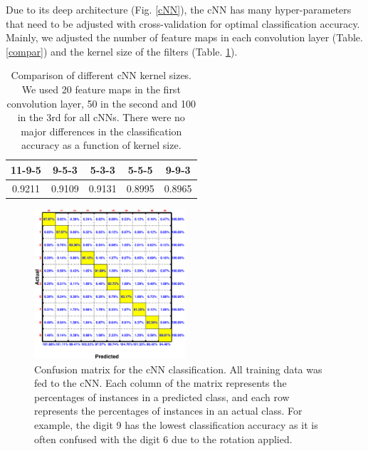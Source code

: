\documentclass[conference]{IEEEtran}
\begin{document}
Due to its deep architecture (Fig. \ref{cNN}), the cNN has many hyper-parameters that need to be adjusted with cross-validation for optimal classification accuracy. Mainly, we adjusted the number of feature maps in each convolution layer (Table. \ref{compar}) and the kernel size of the filters (Table. \ref{comparCNN}).

\begin{table}[htbp]
\footnotesize
\centering
\caption{\footnotesize Comparison of different cNN kernel sizes. We used 20 feature maps in the first convolution layer, 50 in the second and 100 in the 3rd for all cNNs. There were no major differences in the classification accuracy as a function of kernel size.}
\begin{tabular}{|c|c|c|c|c|}
\hline
11-9-5 & 9-5-3 & 5-3-3 & 5-5-5 & 9-9-3 \\
\hline
0.9211 & 0.9109 & 0.9131 & 0.8995 & 0.8965 \\
\hline
\end{tabular}
\label{comparCNN}
\end{table}
\normalsize

\begin{figure}[H]
\centering
\includegraphics[width=0.5\textwidth]{confusionMat.eps}
\caption{\scriptsize Confusion matrix for the cNN classification. All training data was fed to the cNN. Each column of the matrix represents the percentages of instances in a predicted class, and each row represents the percentages of instances in an actual class. For example, the digit 9 has the lowest classification accuracy as it is often confused with the digit 6 due to the rotation applied.}
\label{confMat}
\end{figure}
\end{document}
